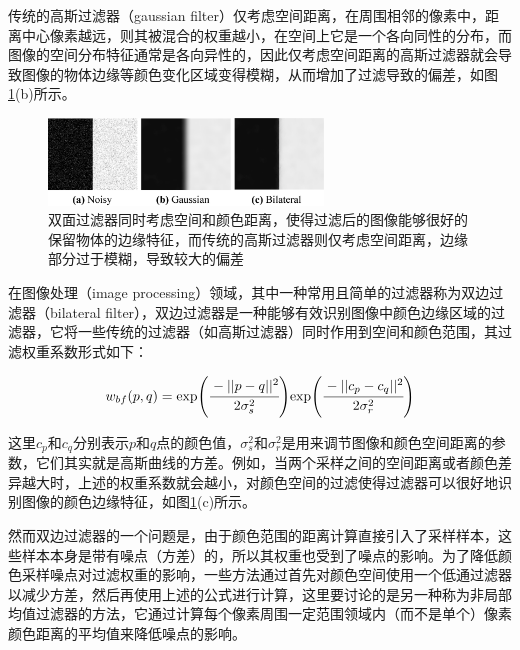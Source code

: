 传统的高斯过滤器（gaussian filter）仅考虑空间距离，在周围相邻的像素中，距离中心像素越远，则其被混合的权重越小，在空间上它是一个各向同性的分布，而图像的空间分布特征通常是各向异性的，因此仅考虑空间距离的高斯过滤器就会导致图像的物体边缘等颜色变化区域变得模糊，从而增加了过滤导致的偏差，如图\ref{f:pt-gaussian-and-bilateral-filters}(b)所示。

\begin{figure}
\sidecaption
	\includegraphics[width=0.65\textwidth]{figures/pt/gaussian-and-bilateral-filters}
	\caption{双面过滤器同时考虑空间和颜色距离，使得过滤后的图像能够很好的保留物体的边缘特征，而传统的高斯过滤器则仅考虑空间距离，边缘部分过于模糊，导致较大的偏差}
	\label{f:pt-gaussian-and-bilateral-filters}
\end{figure}

在图像处理（image processing）领域，其中一种常用且简单的过滤器称为双边过滤器（bilateral filter）\cite{a:Bilateralfilteringforgrayandcolorimages,a:Ontheoriginofthebilateralfilterandwaystoimproveit}，双边过滤器是一种能够有效识别图像中颜色边缘区域的过滤器，它将一些传统的过滤器（如高斯过滤器）同时作用到空间和颜色范围，其过滤权重系数形式如下：

\begin{equation}
	w_{bf}(p,q)=\text{exp}\Biggl(  \cfrac{-||p-q||^{2}}{2\sigma^{2}_{s}}\Biggl)\text{exp}\Biggl(  \cfrac{-||c_p-c_q||^{2}}{2\sigma^{2}_{r}}\Biggl)
\end{equation}

\noindent 这里$c_p$和$c_q$分别表示$p$和$q$点的颜色值，$\sigma^{2}_s$和$\sigma^{2}_r$是用来调节图像和颜色空间距离的参数，它们其实就是高斯曲线的方差。例如，当两个采样之间的空间距离或者颜色差异越大时，上述的权重系数就会越小，对颜色空间的过滤使得过滤器可以很好地识别图像的颜色边缘特征，如图\ref{f:pt-gaussian-and-bilateral-filters}(c)所示。

然而双边过滤器的一个问题是，由于颜色范围的距离计算直接引入了采样样本，这些样本本身是带有噪点（方差）的，所以其权重也受到了噪点的影响。为了降低颜色采样噪点对过滤权重的影响，一些方法\cite{a:AnovelMonteCarlonoisereductionoperator}通过首先对颜色空间使用一个低通过滤器以减少方差，然后再使用上述的公式进行计算，这里要讨论的是另一种称为非局部均值过滤器\cite{a:Areviewofimagedenoisingalgorithmswithanewone}的方法，它通过计算每个像素周围一定范围领域内（而不是单个）像素颜色距离的平均值来降低噪点的影响。

